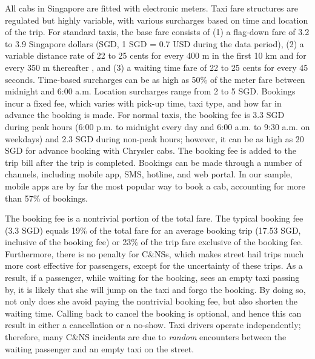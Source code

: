 \documentclass[reviewmode]{restud}
\begin{document}
All cabs in Singapore are fitted with electronic meters. Taxi fare structures are regulated but highly variable,
with various surcharges based on time and location of the trip. For standard taxis, the base fare consists of (1) a flag-down fare of 3.2 to 3.9 Singapore dollars (SGD, 1 SGD = 0.7 USD during the data period), 
(2) a variable distance rate of 22 to 25 cents for every 400 m in the first 10 km and %
for every 350 m thereafter%
, and (3) a waiting time fare of 22 to 25 cents for every 45 seconds. Time-based surcharges can be as high as 50\% of the meter fare between midnight and 6:00 a.m. Location surcharges range from 2 to 5 SGD. Bookings incur a fixed fee, which varies with pick-up time, taxi type, and how far in advance the booking is made. For normal taxis, the booking fee is 3.3 SGD during peak hours (6:00 p.m. to midnight every day and 6:00 a.m. to 9:30 a.m. on weekdays) and 2.3 SGD during non-peak hours; however, it can be as high as 20 SGD for advance booking with Chrysler cabs. The booking fee is added to the trip bill after the trip is completed. Bookings can be made through a number of channels, including mobile app, SMS, hotline, and web portal. In our sample, mobile apps are by far the most popular way to book a cab, accounting for more than 57\% of bookings.

The booking fee is a nontrivial portion of the total fare. The typical booking fee (3.3 SGD) equals 19\% of the total fare for an average booking trip (17.53 SGD, inclusive of the booking fee) or 23\% of the trip fare exclusive of the booking fee. Furthermore, there is no penalty for C\&NSs, which makes street hail trips much more cost effective for passengers, except for the uncertainty of these trips. As a result, if a passenger, while waiting for the booking, sees an empty taxi passing by, it is likely that she will jump on the taxi and forgo the booking. By doing so, not only does she avoid paying the nontrivial booking fee, but also shorten the waiting time. Calling back to cancel the booking is optional, and hence this can result in either a cancellation or a no-show. Taxi drivers operate independently; therefore, many C\&NS incidents are due to \textit{random} encounters between the waiting passenger and an empty taxi on the street.
\end{document}
